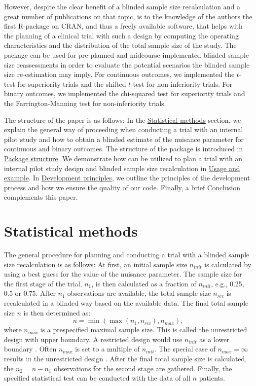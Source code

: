 However, despite the clear benefit of a blinded sample size
recalculation and a great number of publications on that topic,
 is to the knowledge of the authors the first R-package
on CRAN, and thus a freely available software, that helps with the
planning of a clinical trial with such a design by computing the
operating characteristics and the distribution of the total sample size
of the study. The package can be used for pre-planned and midcourse
implemented blinded sample size reassessments in order to evaluate the
potential scenarios the blinded sample size re-estimation may imply. For
continuous outcomes, we implemented the \(t\)-test for superiority
trials and the shifted \(t\)-test for non-inferiority trials. For binary
outcomes, we implemented the chi-squared test for superiority trials and
the Farrington-Manning test for non-inferiority trials.

The structure of the paper is as follows: In the
\protect\hyperlink{statistical-methods}{Statistical methods} section, we
explain the general way of proceeding when conducting a trial with an
internal pilot study and how to obtain a blinded estimate of the
nuisance parameter for continuous and binary outcomes. The structure of
the package is introduced in
\protect\hyperlink{package-structure}{Package structure}. We demonstrate
how  can be utilized to plan a trial with an internal
pilot study design and blinded sample size recalculation in
\protect\hyperlink{usage-and-example}{Usage and example}. In
\protect\hyperlink{development-principles}{Development principles}, we
outline the principles of the development process and how we ensure the
quality of our code. Finally, a brief
\protect\hyperlink{conclusion}{Conclusion} complements this paper.

\hypertarget{statistical-methods}{%
\section{Statistical methods}\label{statistical-methods}}

The general procedure for planning and conducting a trial with a blinded
sample size recalculation is as follows: At first, an initial sample
size \(n_{init}\) is calculated by using a best guess for the value of
the nuisance parameter. The sample size for the first stage of the
trial, \(n_1\), is then calculated as a fraction of \(n_{init}\), e.g.,
0.25, 0.5 or 0.75. After \(n_1\) observations are available, the total
sample size \(n_{rec}\) is recalculated in a blinded way based on the
available data. The final total sample size \(n\) is then determined as:
\[ n = \min\left(\max\left(n_1, n_{rec}\right), n_{max}\right),\] 
where \(n_{max}\) is a prespecified maximal sample size.
This is called the unrestricted design with upper boundary. 
A restricted design would use \(n_{init}\) as a
lower boundary \citep{Wittes1990}. Often \(n_{max}\) is set to a
multiple of \(n_{init}\). The special case of \(n_{max} = \infty\)
results in the unrestricted design \citep{Birkett1994}. After the final
total sample size is calculated, the \(n_2 = n - n_1\) observations for
the second stage are gathered. Finally, the specified statistical test
can be conducted with the data of all \(n\) patients.

